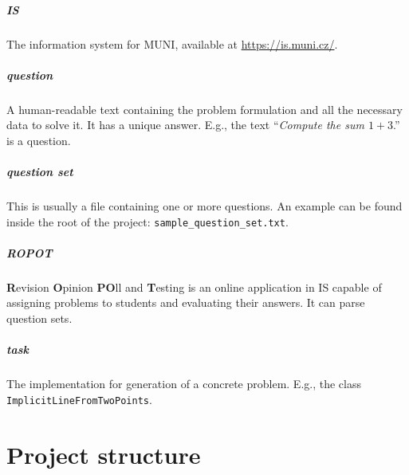 \documentclass[
  digital, %
  table,   %
  twoside, %
  nolof,     %
  nolot,     %
  draft=false,
  final,
]{fithesis3}
\begin{document}
\paragraph{IS}

The information system for MUNI, available at \href{https://is.muni.cz/}{https://is.muni.cz/}.

\paragraph{question}

A human-readable text containing the problem formulation and all the necessary data to solve it. It has a unique answer. E.g., the text ``\textit{Compute the sum $1 + 3$}.'' is a question.


\paragraph{question set}

This is usually a file containing one or more questions. An example can be found inside the root of the project: \newline \verb|sample_question_set.txt|.

\paragraph{ROPOT}

\textbf{R}evision \textbf{O}pinion \textbf{PO}ll and \textbf{T}esting is an online application in IS capable of assigning problems to students and evaluating their answers. It can parse question sets.


\paragraph{task}

The implementation for generation of a concrete problem. E.g., the class \verb|ImplicitLineFromTwoPoints|.


\appendix




\chapter{Project structure}
\end{document}
